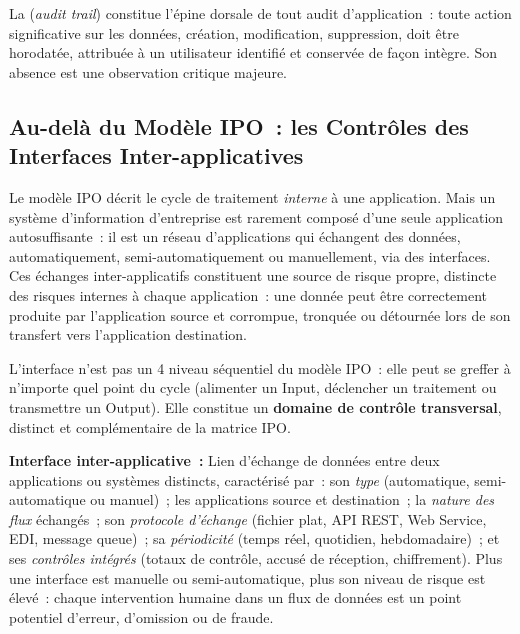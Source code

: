La  (\textit{audit trail}) constitue l'épine dorsale de tout
audit d'application~: toute action significative sur les données, création,
modification, suppression, doit être horodatée, attribuée à un utilisateur identifié
et conservée de façon intègre. Son absence est une observation critique majeure.

\subsection{Au-delà du Modèle IPO~: les Contrôles des Interfaces Inter-applicatives}
\label{subsec:controles-interfaces}

Le modèle IPO décrit le cycle de traitement \emph{interne} à une application. Mais
un système d'information d'entreprise est rarement composé d'une seule application
autosuffisante~: il est un réseau d'applications qui échangent des données,
automatiquement, semi-automatiquement ou manuellement, via des interfaces. Ces
échanges inter-applicatifs constituent une source de risque propre, distincte des
risques internes à chaque application~: une donnée peut être correctement produite
par l'application source et corrompue, tronquée ou détournée lors de son transfert
vers l'application destination.

L'interface n'est pas un 4 niveau séquentiel du modèle IPO~: elle peut se
greffer à n'importe quel point du cycle (alimenter un Input, déclencher un traitement
ou transmettre un Output). Elle constitue un \textbf{domaine de contrôle transversal},
distinct et complémentaire de la matrice IPO.

\begin{boxdef}
\textbf{Interface inter-applicative~:}
Lien d'échange de données entre deux applications ou systèmes distincts, caractérisé
par~: son \emph{type} (automatique, semi-automatique ou manuel)~; les applications
source et destination~; la \emph{nature des flux} échangés~; son \emph{protocole
d'échange} (fichier plat, API REST, Web Service, EDI, message queue)~; sa
\emph{périodicité} (temps réel, quotidien, hebdomadaire)~; et ses \emph{contrôles
intégrés} (totaux de contrôle, accusé de réception, chiffrement). Plus une interface
est manuelle ou semi-automatique, plus son niveau de risque est élevé~: chaque
intervention humaine dans un flux de données est un point potentiel d'erreur,
d'omission ou de fraude.
\end{boxdef}


